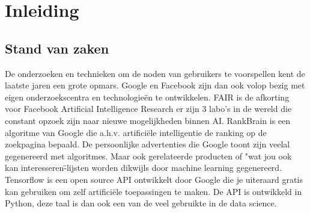 
\chapter{Inleiding}
\label{ch:inleiding}




\section{Stand van zaken}
\label{sec:stand-van-zaken}



De onderzoeken en technieken om de noden van gebruikers te voorspellen kent de laatste jaren een grote opmars. Google en Facebook zijn dan ook volop bezig met eigen onderzoekscentra en technologieën te ontwikkelen. FAIR is de afkorting voor Facebook Artificial Intelligence Research er zijn 3 labo's in de wereld die constant opzoek zijn naar nieuwe mogelijkheden binnen AI. RankBrain is een algoritme van Google die a.h.v. artificiële intelligentie de ranking op de zoekpagina bepaald.
De persoonlijke advertenties die Google toont zijn veelal gegenereerd met algoritmes.  Maar ook gerelateerde producten of "wat jou ook kan interesseren\"-lijsten worden dikwijls door machine learning gegenereerd. Tensorflow \autocite{tensorflow} is een open source API ontwikkelt door Google die je uiteraard gratis kan gebruiken om zelf artificiële toepassingen te maken. De API is ontwikkeld in Python, deze taal is dan ook een van de veel gebruikte in de data science.

